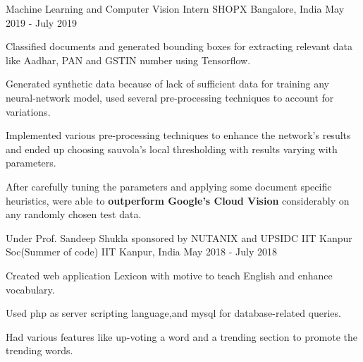 

\begin{cventries}

  \cventry
    {Machine Learning and Computer Vision Intern} %
    {SHOPX} %
    {Bangalore, India} %
    {May 2019 - July 2019} %
    {
      \begin{cvitems} %
        \item {Classified documents and generated bounding boxes for extracting relevant data like Aadhar, PAN and GSTIN number using Tensorflow.}
        \item {Generated synthetic data because of lack of sufficient data for training any neural-network model, used several pre-processing techniques to account for variations.}
        \item {Implemented various pre-processing techniques to enhance the network’s
        results and ended up choosing sauvola’s local thresholding with results varying with parameters.}
        \item {After carefully tuning the parameters and applying some document specific heuristics, were able to \textbf{outperform Google’s Cloud Vision} considerably on any randomly chosen test data.}
      \end{cvitems}
    }

  \cventry
    {Under Prof. Sandeep Shukla sponsored by NUTANIX and UPSIDC} %
    {IIT Kanpur Soc(Summer of code)} %
    {IIT Kanpur, India} %
    {May 2018 - July 2018} %
    {
      \begin{cvitems} %
        \item {Created web application Lexicon with motive to teach English and enhance vocabulary.}
        \item {Used php as server scripting language,and mysql for database-related queries.}
        \item {Had various features like up-voting a word and a trending section to promote the trending words.}
      \end{cvitems}
    }

\end{cventries}
